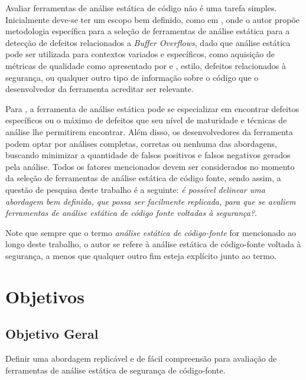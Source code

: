 Avaliar ferramentas de análise estática de código não é uma tarefa simples.
Inicialmente deve-se ter um escopo bem definido, como em \cite{harvard}, onde o autor propõe metodologia específica para a seleção de ferramentas de análise estática para a detecção de defeitos relacionados a \textit{Buffer Overflows}, dado que análise estática pode ser utilizada para contextos variados e específicos, como aquisição de métricas de qualidade como apresentado por \cite{meirelles2013} e \cite{analizoartigo}, estilo, defeitos relacionados à segurança, ou qualquer outro tipo de informação sobre o código que o desenvolvedor da ferramenta acreditar ser relevante.

Para \cite{secure_programming}, a ferramenta de análise estática pode se especializar em encontrar defeitos específicos ou o máximo de defeitos que seu nível de maturidade e técnicas de análise lhe permitirem encontrar. Além disso, os desenvolvedores da ferramenta podem optar por análises completas, corretas ou nenhuma das abordagens, buscando minimizar a quantidade de falsos positivos e falsos negativos gerados pela análise. Todos os fatores mencionados devem ser considerados no momento da seleção de ferramentas de análise estática de código fonte, sendo assim, a questão de pesquisa deste trabalho é a seguinte: \textit{é possível delinear uma abordagem bem definida, que possa ser facilmente replicada, para que se avaliem ferramentas de análise estática de código fonte voltadas à segurança?}.

Note que sempre que o termo \textit{análise estática de código-fonte} for mencionado ao longo deste trabalho, o autor se refere à análise estática de código-fonte voltada à segurança, a menos que qualquer outro fim esteja explícito junto ao termo.

\section*{Objetivos}
\subsection*{Objetivo Geral}

Definir uma abordagem replicável e de fácil compreensão para avaliação de ferramentas de análise estática de segurança de código-fonte.

